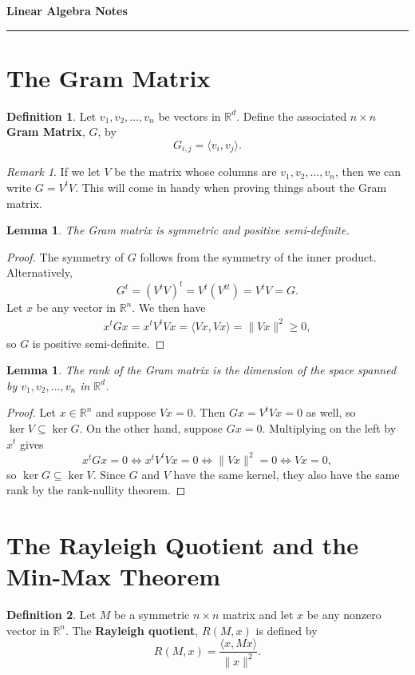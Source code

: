 \documentclass[11pt,letterpaper]{article}
\newcommand{\reals}{\mathbb{R}}
\newtheorem{lemma}[theorem]{Lemma}
\theoremstyle{definition}
\newtheorem{definition}{Definition}[section]
\theoremstyle{remark}
\newtheorem{remark}{Remark}[section]
\begin{document}
\begin{center}
{\bf \Large Linear Algebra Notes}
\vspace{0.2cm}
\hrule
\end{center}

\section{The Gram Matrix}

\begin{definition}
	Let $v_1, v_2, \ldots, v_n$ be vectors in $\reals^d$. Define the associated $n\times n$ \textbf{Gram Matrix}, $G$, by
	\[
	G_{i,j} = \langle v_i, v_j\rangle.
	\]
\end{definition}

\begin{remark}
	If we let $V$ be the matrix whose columns are $v_1, v_2, \ldots, v_n$, then we can write $G = V^tV$. This will come in handy when proving things about the Gram matrix.
\end{remark}

\begin{lemma}
	The Gram matrix is symmetric and positive semi-definite.
\end{lemma}
\begin{proof}
	The symmetry of $G$ follows from the symmetry of the inner product. Alternatively,
	\[
	G^t = (V^tV)^t = V^t(V^{tt}) = V^tV = G.
	\]
	Let $x$ be any vector in $\reals^n$. We then have
	\begin{align*}
		x^tGx = x^tV^tVx = \langle Vx, Vx\rangle  = \|Vx\|^2 \geq 0,
	\end{align*}
	so $G$ is positive semi-definite.
\end{proof}


\begin{lemma}
	The rank of the Gram matrix is the dimension of the space spanned by $v_1, v_2, \ldots, v_n$ in $\reals^d$.
\end{lemma}
\begin{proof}
	Let $x\in \reals^n$ and suppose $Vx = 0$. Then $Gx = V^tVx = 0$ as well, so $\ker V\subseteq \ker G$. On the other hand, suppose $Gx = 0$. Multiplying on the left by $x^t$ gives
	\[
	x^tGx = 0 \iff x^t V^t Vx = 0 \iff \|Vx\|^2 = 0 \iff Vx = 0,
	\]
	so $\ker G\subseteq \ker V$. Since $G$ and $V$ have the same kernel, they also have the same rank by the rank-nullity theorem.
\end{proof}

\section{The Rayleigh Quotient and the Min-Max Theorem}
\begin{definition}
	Let $M$ be a symmetric $n\times n$ matrix and let $x$ be any nonzero vector in $\reals^n$. The \textbf{Rayleigh quotient}, $R(M, x)$ is defined by
	\[
	R(M, x) = \frac{\langle x, Mx\rangle}{\|x\|^2}.
	\]
\end{definition}
\end{document}
